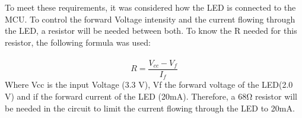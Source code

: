 To meet these requirements, it was considered how the LED is connected to the MCU. To control the forward Voltage intensity and the current flowing through the LED, a resistor will be needed between both. To know the R needed for this resistor, the following formula was used:\\\\
\begin{equation}
R = \frac{V_{cc} - V_{f}}{I_{f}}
\end{equation}
Where Vcc is the input Voltage (3.3 V), Vf the forward voltage of the LED(2.0 V) and if the forward current of the LED (20\si{\mA}). Therefore, a 68\si{\ohm} resistor will be needed in the circuit to limit the current flowing through the LED to 20\si{\mA}.  \\\\
